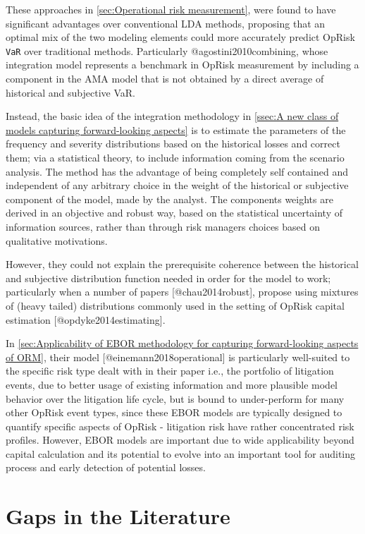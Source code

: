 \documentclass[]{article}
\begin{document}
These approaches in \ref{sec:Operational risk measurement}, were found
to have significant advantages over conventional LDA methods, proposing
that an optimal mix of the two modeling elements could more accurately
predict OpRisk \texttt{VaR} over traditional methods. Particularly
@agostini2010combining, whose integration model represents a benchmark
in OpRisk measurement by including a component in the AMA model that is
not obtained by a direct average of historical and subjective
VaR.\medskip

Instead, the basic idea of the integration methodology in
\ref{ssec:A new class of models capturing forward-looking aspects} is to
estimate the parameters of the frequency and severity distributions
based on the historical losses and correct them; via a statistical
theory, to include information coming from the scenario analysis. The
method has the advantage of being completely self contained and
independent of any arbitrary choice in the weight of the historical or
subjective component of the model, made by the analyst. The components
weights are derived in an objective and robust way, based on the
statistical uncertainty of information sources, rather than through risk
managers choices based on qualitative motivations. \medskip

However, they could not explain the prerequisite coherence between the
historical and subjective distribution function needed in order for the
model to work; particularly when a number of papers
{[}@chau2014robust{]}, propose using mixtures of (heavy tailed)
distributions commonly used in the setting of OpRisk capital estimation
{[}@opdyke2014estimating{]}.\medskip

In
\ref{sec:Applicability of EBOR methodology for capturing forward-looking aspects of ORM},
their model {[}@einemann2018operational{]} is particularly well-suited
to the specific risk type dealt with in their paper i.e., the portfolio
of litigation events, due to better usage of existing information and
more plausible model behavior over the litigation life cycle, but is
bound to under-perform for many other OpRisk event types, since these
EBOR models are typically designed to quantify specific aspects of
OpRisk - litigation risk have rather concentrated risk profiles.
However, EBOR models are important due to wide applicability beyond
capital calculation and its potential to evolve into an important tool
for auditing process and early detection of potential losses.\medskip

\section{Gaps in the Literature}
\end{document}
